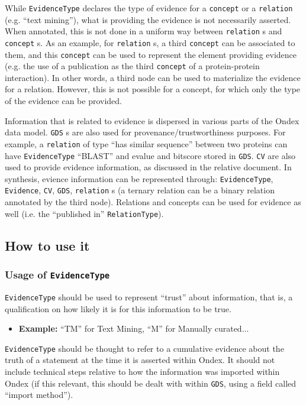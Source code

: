 \documentclass[a4paper,10pt]{article}
\newcommand{\example}[1]{\item\textbf{Example: }#1\xspace}
\newcommand{\term}[1]{\texttt{#1}\xspace}
\begin{document}
While \term{EvidenceType} declares the type of evidence for a \term{concept} or a \term{relation} (e.g. ``text mining''), what is providing the evidence is not necessarily asserted. When annotated, this is not done in a uniform way between \term{relation}s and \term{concept}s.
As an example, for \term{relation}s, a third \term{concept} can be associated to them, and this \term{concept} can be used to represent the element providing evidence (e.g. the use of a publication as the third \term{concept} of a protein-protein interaction). In other words, a third node can be used to materialize the evidence for a relation. However, this is not possible for a concept, for which only the type of the evidence can be provided.
\vskip 0.3cm

Information that is related to evidence is dispersed in various parts of the Ondex data model. \term{GDS}s are also used for provenance/trustworthiness purposes. For example, a \term{relation} of type ``has similar sequence'' between two proteins can have \term{EvidenceType} ``BLAST'' and evalue and bitscore stored in \term{GDS}. \term{CV} are also used to provide evidence information, as discussed in the relative document.
In synthesis, evience information can be represented through: \term{EvidenceType}, \term{Evidence}, \term{CV}, \term{GDS}, \term{relation}s (a ternary relation can be a binary relation annotated by the third node). Relations and concepts can be used for evidence as well (i.e. the ``published in'' \term{RelationType}).


\subsection{How to use it}

\subsubsection{Usage of \term{EvidenceType}}

\term{EvidenceType} should be used to represent ``trust'' about information, that is, a qualification on how likely it is for this information to be true. 

\begin{itemize}
\example{``TM'' for Text Mining, ``M'' for Manually curated...}
\end{itemize}
\noindent
\term{EvidenceType} should be thought to refer to a cumulative evidence about the truth of a statement at the time it is asserted within Ondex. It should not include technical steps relative to how the information was imported within Ondex (if this relevant, this should be dealt with within \term{GDS}, using a field called ``import method'').
\end{document}
